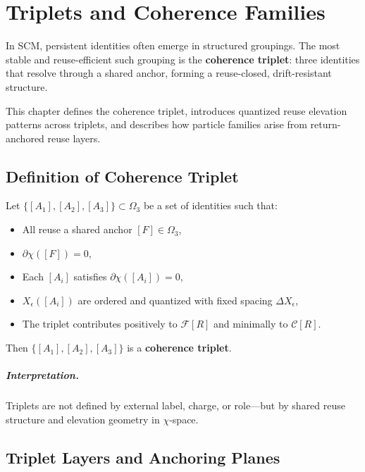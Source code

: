 \chapter{Triplets and Coherence Families} \label{chapter-triplets}

In SCM, persistent identities often emerge in structured groupings. The most stable and reuse-efficient such grouping is the \textbf{coherence triplet}: three identities that resolve through a shared anchor, forming a reuse-closed, drift-resistant structure.

This chapter defines the coherence triplet, introduces quantized reuse elevation patterns across triplets, and describes how particle families arise from return-anchored reuse layers.

\section{Definition of Coherence Triplet} \label{sec:triplet-definition}

Let $\{ [A_1], [A_2], [A_3] \} \subset \Omega_3$ be a set of identities such that:

\begin{itemize}
    \item All reuse a shared anchor $[F] \in \Omega_3$,
    \item $\partial\chi([F]) = 0$,
    \item Each $[A_i]$ satisfies $\partial\chi([A_i]) = 0$,
    \item $X_\epsilon([A_i])$ are ordered and quantized with fixed spacing $\Delta X_\epsilon$,
    \item The triplet contributes positively to $\mathcal{F}[R]$ and minimally to $\mathcal{C}[R]$.
\end{itemize}

Then $\{[A_1],[A_2],[A_3]\}$ is a \textbf{coherence triplet}.

\paragraph{Interpretation.}
Triplets are not defined by external label, charge, or role—but by shared reuse structure and elevation geometry in $\chi$-space.

\section{Triplet Layers and Anchoring Planes} \label{sec:triplet-planes}


